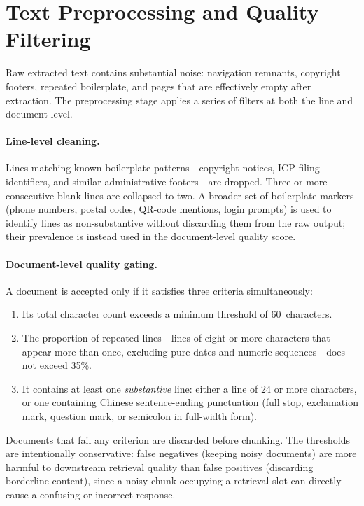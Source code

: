 \section{Text Preprocessing and Quality Filtering}

Raw extracted text contains substantial noise: navigation remnants, copyright footers, repeated boilerplate, and pages that are effectively empty after extraction. The preprocessing stage applies a series of filters at both the line and document level.

\paragraph{Line-level cleaning.} Lines matching known boilerplate patterns---copyright notices, ICP filing identifiers, and similar administrative footers---are dropped. Three or more consecutive blank lines are collapsed to two. A broader set of boilerplate markers (phone numbers, postal codes, QR-code mentions, login prompts) is used to identify lines as non-substantive without discarding them from the raw output; their prevalence is instead used in the document-level quality score.

\paragraph{Document-level quality gating.} A document is accepted only if it satisfies three criteria simultaneously:
\begin{enumerate}
    \item Its total character count exceeds a minimum threshold of 60~characters.
    \item The proportion of repeated lines---lines of eight or more characters that appear more than once, excluding pure dates and numeric sequences---does not exceed 35\%.
    \item It contains at least one \emph{substantive} line: either a line of 24 or more characters, or one containing Chinese sentence-ending punctuation (full stop, exclamation mark, question mark, or semicolon in full-width form).
\end{enumerate}
Documents that fail any criterion are discarded before chunking. The thresholds are intentionally conservative: false negatives (keeping noisy documents) are more harmful to downstream retrieval quality than false positives (discarding borderline content), since a noisy chunk occupying a retrieval slot can directly cause a confusing or incorrect response.

